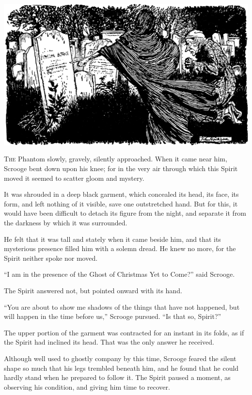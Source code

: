 \documentclass[paper=5.5in:8.5in,BCOR=7mm,twoside,DIV=calc,12pt,usegeometry]{scrbook} %
\begin{document}
\begin{minipage}[c]{\linewidth}
\includegraphics[width=\linewidth]{graveimproved}
\end{minipage}
\vfill

\lettrine[loversize=.85]{T}{he} Phantom slowly, gravely, silently approached. When it came near him, Scrooge bent down upon his knee; for in the very air through which this Spirit moved it seemed to scatter gloom and mystery.

It was shrouded in a deep black garment, which concealed its head, its face, its form, and left nothing of it visible, save one outstretched hand. But for this, it would have been difficult to detach its figure from the night, and separate it from the darkness by which it was surrounded.

He felt that it was tall and stately when it came beside him, and that its mysterious presence filled him with a solemn dread. He knew no more, for the Spirit neither spoke nor moved.

\enquote{I am in the presence of the Ghost of Christmas Yet to Come?} said Scrooge.

The Spirit answered not, but pointed onward with its hand.

\enquote{You are about to show me shadows of the things that have not happened, but will happen in the time before us,} Scrooge pursued. \enquote{Is that so, Spirit?}

The upper portion of the garment was contracted for an instant in its folds, as if the Spirit had inclined its head. That was the only answer he received.

Although well used to ghostly company by this time, Scrooge feared the silent shape so much that his legs trembled beneath him, and he found that he could hardly stand when he prepared to follow it. The Spirit paused a moment, as observing his condition, and giving him time to recover.
\end{document}
